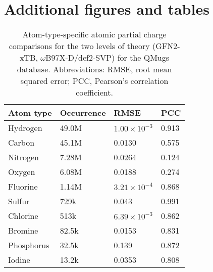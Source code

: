 \section{Additional figures and tables}


\begin{table}[ht]
\caption{Atom-type-specific atomic partial charge comparisons for the two levels of theory (GFN2-xTB, $\omega$B97X-D/def2-SVP) for the QMugs database. Abbreviations: RMSE, root mean squared error; PCC, Pearson's correlation coefficient.}
\centering
\begin{tabular}{@{}llll@{}}
\toprule
\textbf{Atom type} & \textbf{Occurrence} & \textbf{RMSE}          & \textbf{PCC} \\ \midrule
Hydrogen           & 49.0M  & $1.00 \times 10^{-3}$   & 0.913        \\
Carbon         & 45.1M  & 0.0130                   & 0.575          \\
Nitrogen         & 7.28M  & 0.0264                  & 0.124        \\
Oxygen           & 6.08M  & 0.0188                  & 0.274        \\
Fluorine         & 1.14M  & $3.21 \times 10^{-4}$   & 0.868        \\
Sulfur           & 729k  & 0.043                   & 0.991        \\
Chlorine         & 513k  & $6.39 \times 10^{-3}$   & 0.862        \\
Bromine          & 82.5k & 0.0153                   & 0.831        \\
Phosphorus       & 32.5k  & 0.139                   & 0.872        \\
Iodine           & 13.2k  & 0.0353                   & 0.808        \\ \bottomrule
\end{tabular}%
\end{table}



